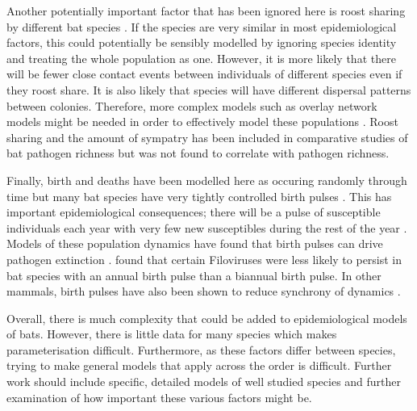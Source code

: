 Another potentially important factor that has been ignored here is roost sharing by different bat species \cite{maganga2014bat, lopez2014seroprevalence, serra2002european, pons2014insights, deThoisy2016bioecological}.
If the species are very similar in most epidemiological factors, this could potentially be sensibly modelled by ignoring species identity and treating the whole population as one.
However, it is more likely that there will be fewer close contact events between individuals of different species even if they roost share.
It is also likely that species will have different dispersal patterns between colonies.
Therefore, more complex models such as overlay network models might be needed in order to effectively model these populations \cite{funk2010interacting, marceau2011modeling}.
Roost sharing and the amount of sympatry has been included in comparative studies of bat pathogen richness \cite{maganga2014bat} but was not found to correlate with pathogen richness.

Finally, birth and deaths have been modelled here as occuring randomly through time but many bat species have very tightly controlled birth pulses \cite{dietrich2015leptospira, george2011host, porter2001birth, greiner2011predictable}.
This has important epidemiological consequences; there will be a pulse of susceptible individuals each year with very few new susceptibles during the rest of the year \cite{dietrich2015leptospira}.
Models of these population dynamics have found that birth pulses can drive pathogen extinction \cite{peel2014effect}.
\textcite{hayman2015biannual} found that certain Filoviruses were less likely to persist in bat species with an annual birth pulse than a biannual birth pulse.
In other mammals, birth pulses have also been shown to reduce synchrony of dynamics \cite{duke2011strong}.

Overall, there is much complexity that could be added to epidemiological models of bats.
However, there is little data for many species which makes parameterisation difficult.
Furthermore, as these factors differ between species, trying to make general models that apply across the order is difficult.
Further work should include specific, detailed models of well studied species and further examination of how important these various factors might be.




